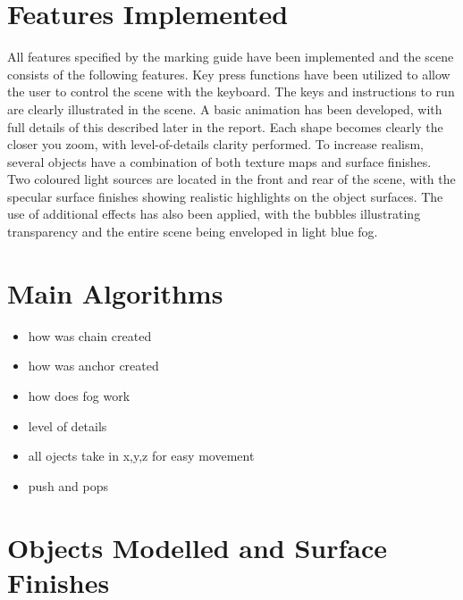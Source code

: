 \documentclass[]{article}
\begin{document}

\vspace*{0.8cm}
\section*{Features Implemented}

All features specified by the marking guide have been implemented and the scene consists of the following features. Key press functions have been utilized to allow the user to control the scene with the keyboard. The keys and instructions to run are clearly illustrated in the scene. A basic animation has been developed, with full details of this described later in the report. Each shape becomes clearly the closer you zoom, with level-of-details clarity performed. To increase realism, several objects have a combination of both texture maps and surface finishes. Two coloured light sources are located in the front and rear of the scene, with the specular surface finishes showing realistic highlights on the object surfaces. The use of additional effects has also been applied, with the bubbles illustrating transparency and the entire scene being enveloped in light blue fog.


\section*{Main Algorithms}

\begin{itemize}
	\item how was chain created
	\item how was anchor created
	\item how does fog work 
	\item level of details 
	\item all ojects take in x,y,z for easy movement
	\item push and pops
\end{itemize}


\section*{Objects Modelled and Surface Finishes}
\end{document}
